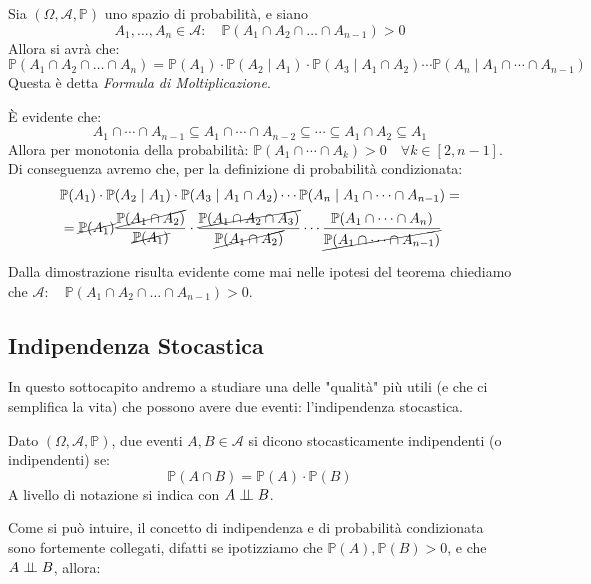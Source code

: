 \begin{teorema}
    Sia $(\Omega, \mathcal{A}, \mathbb{P})$ uno spazio di probabilità, e siano \[A_1, \dots, A_n \in \mathcal{A}:\quad \mathbb{P}(A_1\cap A_2\cap\dots\cap A_{n-1})>0\]
    Allora si avrà che:
    \[\mathbb{P}(A_1\cap A_2\cap\dots\cap A_n) = \mathbb{P}(A_1)\cdot\mathbb{P}(A_2\mid A_1)\cdot \mathbb{P}(A_3\mid A_1\cap A_2)\cdots\mathbb{P}(A_n\mid A_1\cap\cdots\cap A_{n-1})\]
    Questa è detta \textit{Formula di Moltiplicazione}.
\end{teorema}
    \begin{dimostrazione}
        È evidente che: 
        \[A_1\cap\cdots\cap A_{n-1} \subseteq A_1\cap\cdots\cap A_{n-2}\subseteq \cdots \subseteq A_1\cap A_2\subseteq A_1\]
        Allora per monotonia della probabilità: $\mathbb{P}(A_1\cap\cdots\cap A_k)>0\quad \forall k\in[2, n-1]$.\\
        Di conseguenza avremo che, per la definizione di probabilità condizionata: 
        \begin{align*}
            &\mathbb{P}(A_1)\cdot\mathbb{P}(A_2\mid A_1)\cdot \mathbb{P}(A_3\mid A_1\cap A_2)\cdots\mathbb{P}(A_n\mid A_1\cap\cdots\cap A_{n-1}) = \\
            &= \cancel{\mathbb{P}(A_1)}\frac{\cancel{\mathbb{P}(A_1\cap A_2)}}{\cancel{\mathbb{P}(A_1)}}\cdot
            \frac{\cancel{\mathbb{P}(A_1\cap A_2\cap A_3)}}{\cancel{\mathbb{P}(A_1\cap A_2)}}\cdots
            \frac{\mathbb{P}(A_1\cap\cdots\cap A_n)}{\cancel{\mathbb{P}(A_1\cap\cdots\cap A_{n-1})}}
        \end{align*}
    \end{dimostrazione}

Dalla dimostrazione risulta evidente come mai nelle ipotesi del teorema  chiediamo che $\mathcal{A}:\quad \mathbb{P}(A_1\cap A_2\cap\dots\cap A_{n-1})>0$.\\

\subsection{Indipendenza Stocastica}
In questo sottocapito andremo a studiare una delle "qualità" più utili (e che ci semplifica la vita) che possono avere due eventi: l'indipendenza stocastica.
\begin{definizione}
    Dato $(\Omega, \mathcal{A}, \mathbb{P})$, due eventi $A, B\in\mathcal{A}$ si dicono stocasticamente indipendenti (o indipendenti) se:
    \[\mathbb{P}(A\cap B) = \mathbb{P}(A)\cdot\mathbb{P}(B)\]
    A livello di notazione si indica con $A \mathrel{\perp\!\!\!\perp} B$.
\end{definizione}
\bigskip 
\noindent Come si può intuire, il concetto di indipendenza e di probabilità condizionata sono fortemente collegati, difatti se ipotizziamo che $\mathbb{P}(A), \mathbb{P}(B)>0$, e che $A \mathrel{\perp\!\!\!\perp} B$, allora:


